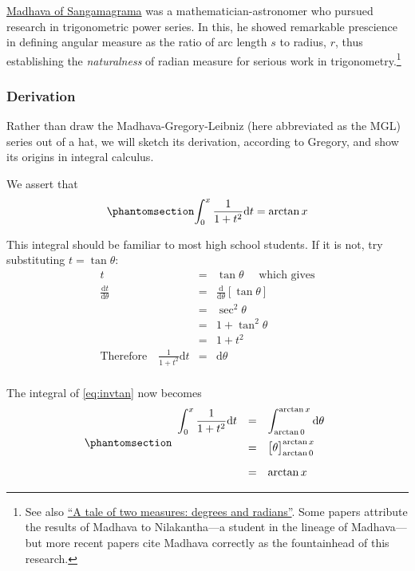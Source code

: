 \documentclass[
  a4paper,
]{article}
\begin{document}
\href{https://en.wikipedia.org/wiki/Madhava_of_Sangamagrama}{Madhava of
Sangamagrama} was a mathematician-astronomer who pursued research in
trigonometric power series. In this, he showed remarkable prescience in
defining angular measure as the ratio of arc length \(s\) to radius,
\(r\), thus establishing the \emph{naturalness} of radian measure for
serious work in trigonometry.\footnote{See also
  \href{https://swanlotus.netlify.app/blogs/a-tale-of-two-measures-degrees-and-radians}{``A
  tale of two measures: degrees and radians''}. Some papers attribute
  the results of Madhava to Nilakantha---a student in the lineage of
  Madhava---but more recent papers cite Madhava correctly as the
  fountainhead of this research.}

\subsubsection{Derivation}\label{derivation}

Rather than draw the Madhava-Gregory-Leibniz (here abbreviated as the
MGL) series out of a hat, we will sketch its derivation, according to
Gregory, and show its origins in integral calculus.

We assert that \begin{equation}\phantomsection\label{eq:invtan}{
\int_{0}^{x}\frac{1}{1+ t^2}{\mathrm{d}} t = \arctan{x}
}\end{equation}

This integral should be familiar to most high school students. If it is
not, try substituting \(t = \tan \theta\): \[
\begin{array}{rcl}
t & = & \tan \theta \quad \mbox{ which gives} \\
\displaystyle \frac{\mathrm{d}t}{\mathrm{d}\theta} & = & \displaystyle \frac{\mathrm{d}}{\mathrm{d}\theta}\left[ \tan \theta \right] \\
& = & \sec^2 \theta \\
& = & 1 + \tan^2 \theta \\
& = & 1 + t^2\\
\mbox{Therefore}\quad\frac{1}{1 + t^2}\mathrm{d} t & = & \mathrm{d}\theta\\
\end{array}
\]

The integral of \cref{eq:invtan} now becomes
\begin{equation}\phantomsection\label{eq:right}{
\begin{array}{rcl}
\displaystyle \int_{0}^{x}\frac{1}{1+ t^2}\mathrm{d}t %
& = & \displaystyle \int_{\arctan0}^{\arctan x} \mathrm{d}\theta\\[1em]
& = & \big[ \theta\big]^{\arctan x}_{\arctan0} \\[1em]
& = & \arctan x
\end{array}
}\end{equation}
\end{document}
